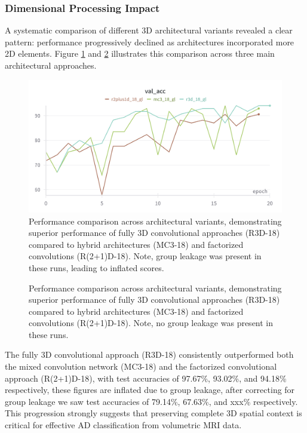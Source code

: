 \documentclass[12pt, a4paper]{article}
\begin{document}
\subsubsection{Dimensional Processing Impact}

A systematic comparison of different 3D architectural variants revealed a clear pattern: performance progressively declined as architectures incorporated more 2D elements. Figure \ref{fig:architecture_comparison_gl} and \ref{fig:architecture_comparison} illustrates this comparison across three main architectural approaches.
\begin{figure}[htbp]
  \centering
  \includegraphics[width=\textwidth]{figures/archs_acc_gl.png}
  \caption{Performance comparison across architectural variants, demonstrating superior performance of fully 3D convolutional approaches (R3D-18) compared to hybrid architectures (MC3-18) and factorized convolutions (R(2+1)D-18). Note, group leakage was present in these runs, leading to inflated scores.}
  \label{fig:architecture_comparison_gl}
\end{figure}

\begin{figure}[htbp]
  \centering
  \caption{Performance comparison across architectural variants, demonstrating superior performance of fully 3D convolutional approaches (R3D-18) compared to hybrid architectures (MC3-18) and factorized convolutions (R(2+1)D-18). Note, no group leakage was present in these runs.}
  \label{fig:architecture_comparison}
\end{figure}

The fully 3D convolutional approach (R3D-18) consistently outperformed both the mixed convolution network (MC3-18) and the factorized convolutional approach (R(2+1)D-18), with test accuracies of 97.67\%, 93.02\%, and 94.18\% respectively, these figures are inflated due to group leakage, after correcting for group leakage we saw test accuracies of 79.14\%, 67.63\%, and xxx\% respectively. This progression strongly suggests that preserving complete 3D spatial context is critical for effective AD classification from volumetric MRI data.
\end{document}
